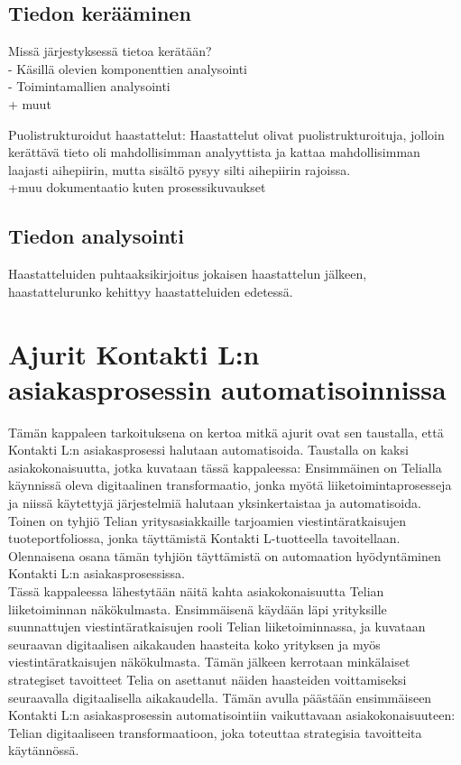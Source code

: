 \documentclass[finnish,12pt,a4paper,pdftex]{article}
\begin{document}
\subsection{Tiedon kerääminen}

Missä järjestyksessä tietoa kerätään? \\
- Käsillä olevien komponenttien analysointi\\
- Toimintamallien analysointi\\
+ muut

Puolistrukturoidut haastattelut:  Haastattelut olivat
puolistrukturoituja, jolloin kerättävä tieto oli mahdollisimman analyyttista ja
kattaa mahdollisimman laajasti aihepiirin, mutta sisältö pysyy silti aihepiirin
rajoissa.\\
+muu dokumentaatio kuten prosessikuvaukset


\subsection{Tiedon analysointi}
Haastatteluiden puhtaaksikirjoitus jokaisen haastattelun jälkeen, haastattelurunko kehittyy haastatteluiden edetessä. 


\section{Ajurit Kontakti L:n asiakasprosessin automatisoinnissa}

Tämän kappaleen tarkoituksena on kertoa mitkä ajurit ovat sen taustalla, että Kontakti L:n asiakasprosessi halutaan automatisoida. Taustalla on kaksi asiakokonaisuutta, jotka kuvataan tässä kappaleessa: Ensimmäinen on Telialla käynnissä oleva digitaalinen transformaatio, jonka myötä liiketoimintaprosesseja ja niissä käytettyjä järjestelmiä halutaan yksinkertaistaa ja automatisoida. Toinen on tyhjiö Telian yritysasiakkaille tarjoamien viestintäratkaisujen tuoteportfoliossa, jonka täyttämistä Kontakti L-tuotteella tavoitellaan. Olennaisena osana tämän tyhjiön täyttämistä on automaation hyödyntäminen Kontakti L:n asiakasprosessissa.\\

Tässä kappaleessa lähestytään näitä kahta asiakokonaisuutta Telian liiketoiminnan näkökulmasta. Ensimmäisenä käydään läpi yrityksille suunnattujen viestintäratkaisujen rooli Telian liiketoiminnassa, ja kuvataan seuraavan digitaalisen aikakauden haasteita koko yrityksen ja myös viestintäratkaisujen näkökulmasta. Tämän jälkeen kerrotaan minkälaiset strategiset tavoitteet Telia on asettanut näiden haasteiden voittamiseksi seuraavalla digitaalisella aikakaudella. Tämän avulla päästään ensimmäiseen Kontakti L:n asiakasprosessin automatisointiin vaikuttavaan asiakokonaisuuteen: Telian digitaaliseen transformaatioon, joka toteuttaa strategisia tavoitteita käytännössä.\\
\end{document}
